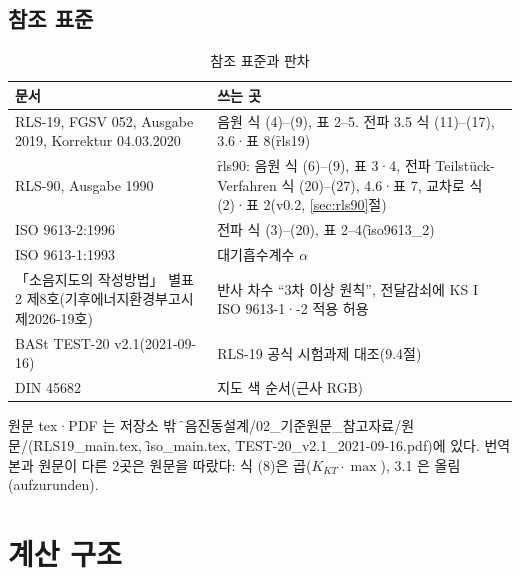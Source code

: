 \documentclass[10.5pt,a4paper]{article}
\begin{document}
\subsection{참조 표준}
\begin{table}[h]\centering\small
\caption{참조 표준과 판차}\label{tab:refs}
\begin{tabularx}{\textwidth}{P{60mm}L}
\toprule
문서 & 쓰는 곳 \\ \midrule
RLS-19, FGSV 052, Ausgabe 2019, Korrektur 04.03.2020 & 음원 식 (4)–(9), 표 2–5. 전파 3.5 식 (11)–(17), 3.6·표 8(\f{rls19}) \\
RLS-90, Ausgabe 1990 & \f{rls90}: 음원 식 (6)–(9), 표 3·4, 전파 Teilstück-Verfahren 식 (20)–(27), 4.6·표 7, 교차로 식 (2)·표 2(v0.2, \ref{sec:rls90}절) \\
ISO 9613-2:1996 & 전파 식 (3)–(20), 표 2–4(\f{iso9613\_2}) \\
ISO 9613-1:1993 & 대기흡수계수 $\alpha$ \\
「소음지도의 작성방법」 별표 2 제8호(기후에너지환경부고시 제2026-19호) & 반사 차수 ``3차 이상 원칙'', 전달감쇠에 KS I ISO 9613-1·-2 적용 허용 \\
BASt TEST-20 v2.1(2021-09-16) & RLS-19 공식 시험과제 대조(9.4절) \\
DIN 45682 & 지도 색 순서(근사 RGB) \\
\bottomrule
\end{tabularx}
\end{table}
원문 tex·PDF 는 저장소 밖 \f{소음진동설계/02\_기준원문\_참고자료/원문/}(\f{RLS19\_main.tex}, \f{iso\_main.tex}, \f{TEST-20\_v2.1\_2021-09-16.pdf})에 있다. 번역본과 원문이 다른 2곳은 원문을 따랐다: 식 (8)은 곱($K_{KT}\cdot\max$), 3.1 은 올림(aufzurunden).

\section{계산 구조}
\end{document}
